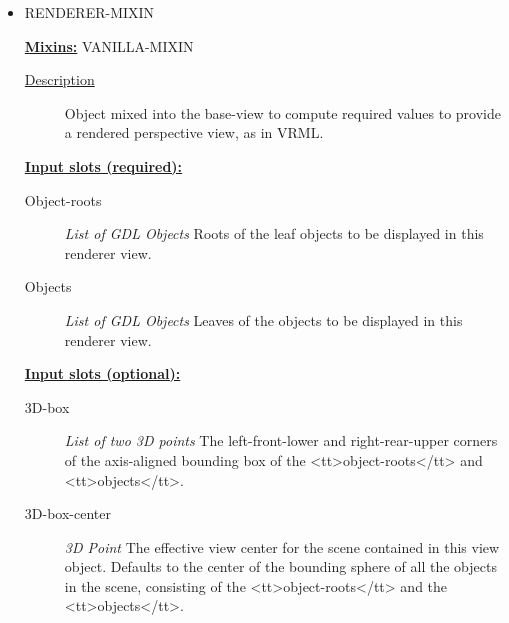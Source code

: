 \documentclass [11pt]{book}
\begin{document}
\begin{itemize}
\begin{description}
\end{description}







\item {}RENDERER-MIXIN


\textbf{
\underline{Mixins:}} VANILLA-MIXIN





\begin{description}

\item [
\underline{Description}]


Object mixed into the base-view to compute required values to provide
a rendered perspective view, as in VRML.



\end{description}








\textbf{
\underline{Input slots (required):}}

\begin{description}

\item [Object-roots]
\emph{List of GDL Objects} Roots of the leaf objects to be displayed in this renderer view.


\item [Objects]
\emph{List of GDL Objects} Leaves of the objects to be displayed in this renderer view.


\end{description}






\textbf{
\underline{Input slots (optional):}}

\begin{description}

\item [3D-box]
\emph{List of two 3D points} The left-front-lower and right-rear-upper corners of the axis-aligned bounding
box of the <tt>object-roots</tt> and <tt>objects</tt>.


\item [3D-box-center]
\emph{3D Point} The effective view center for the scene contained in this view object. Defaults to the center of the bounding sphere of all
the objects in the scene, consisting of the <tt>object-roots</tt> and the <tt>objects</tt>.



\end{description}
\end{itemize}
\end{document}
